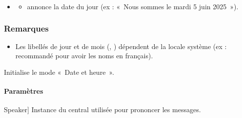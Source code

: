 \documentclass[letterpaper,10pt,french]{sphinxmanual}
\begin{document}
\begin{fulllineitems}
\begin{itemize}
\item {} \begin{description}
\begin{itemize}
\item {} 
\sphinxAtStartPar
annonce la date du jour (ex : « Nous sommes le mardi 5 juin 2025 »).

\end{itemize}

\end{description}

\end{itemize}


\subsubsection{Remarques}
\label{\detokenize{api/modes:remarques}}\begin{itemize}
\item {} 
\sphinxAtStartPar
Les libellés de jour et de mois (, ) dépendent de la locale
système (ex :  recommandé pour avoir les noms en français).

\end{itemize}

\begin{fulllineitems}
\label{\detokenize{api/modes:modes.mode_datetime.ModeDateHeure.__init__}}
\pysigstartsignatures
\pysiglinewithargsret
{}
{}
{}
\pysigstopsignatures
\sphinxAtStartPar
Initialise le mode « Date et heure ».


\paragraph{Paramètres}
\label{\detokenize{api/modes:id1}}\begin{description}
\sphinxlineitem{speaker}{[}Speaker{]}
\sphinxAtStartPar
Instance du  central utilisée pour prononcer les messages.

\end{description}

\end{fulllineitems}


\end{fulllineitems}
\end{document}
